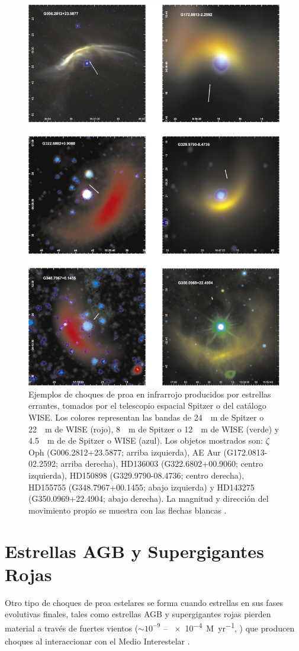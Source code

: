 \begin{figure}
  \centering
  \includegraphics[width=0.7\linewidth]{./Figures/kobulnicky}
  \caption[Ejemplos de choques de proa en infrarrojo producidos por estrellas errantes]{Ejemplos de choques de proa en infrarrojo producidos por estrellas errantes, tomados por el telescopio espacial Spitzer o del catálogo WISE. Los colores representan las bandas de \SI{24}{\mu.m} de Spitzer o \SI{22}{\mu.m} de WISE (rojo), \SI{8}{\mu.m} de Spitzer o \SI{12}{\mu.m} de WISE (verde) y \SI{4.5}{\mu.m} de de Spitzer o WISE (azul). Los objetos mostrados son: $\zeta$\, Oph (G006.2812+23.5877; arriba izquierda), AE Aur (G172.0813-02.2592; arriba derecha), HD136003 (G322.6802+00.9060; centro izquierda), HD150898 (G329.9790-08.4736; centro derecha), HD155755 (G348.7967+00.1455; abajo izquierda) y HD143275 (G350.0969+22.4904; abajo derecha). La magnitud y dirección del movimiento propio se muestra con las flechas blancas \citep{Kobulnicky:2016}.}
  \label{fig:runaway}
\end{figure}

\section{Estrellas AGB y Supergigantes Rojas}
\label{sec:AGBs}
Otro tipo de choques de proa estelares se forma cuando estrellas en sus fases evolutivas finales, tales como estrellas AGB y supergigantes rojas pierden material a través de fuertes vientos ($\sim 10^{-9}$ -- \SI{e-4}{M_\odot.yr^{-1}}, \citet{Prialnik}) que producen choques al interaccionar con el Medio Interestelar \citep{Cox:2012}.


